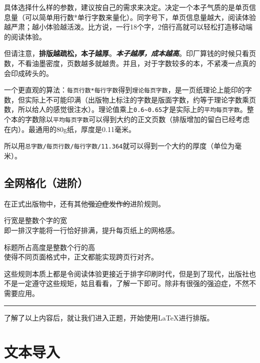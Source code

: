 \documentclass[10pt,openany]{book}
\begin{document}
\begin{sloppypar}
    \blankpar

    具体选择什么样的参数，建议按自己的需求来决定。决定一个本子气质的是单页信息量（可以简单用行数*单行字数来量化）。同字号下，单页信息量越大，阅读体验越严肃；越小体验越活泼。比方说，一行18个字，2倍行高就可以轻松打造移动端的阅读体验。

    但请注意，\textbf{排版越疏松，本子越厚}。\textbf{\textit{本子越厚，成本越高}}。印厂算钱的时候只看页数，不看油墨密度，页数越多就越贵。并且，对于字数较多的本，不紧凑一点真的会印成砖头的。

    一个更直观的算法：\texttt{每页行数*每行字数}得到\texttt{理论每页字数}，是一页纸理论上能印的字数，但实际上不可能印满（出版物上标注的字数是版面字数，约等于理论字数乘页数，所以给人的感觉很注水）。理论值乘上\texttt{0.6\textasciitilde{}0.65}才是实际上的\texttt{平均每页字数}。整个本的字数除以\texttt{平均每页字数}可以得到大约的正文页数（排版增加的留白已经考虑在内）。最通用的80g纸，厚度是0.11毫米。

    所以用\texttt{总字数/每页行数/每行字数/11.364}就可以得到一个大约的厚度（单位为毫米）。

    \section{全网格化（进阶）}

    在正式出版物中，还有其他\sout{强迫症发作的}进阶规则。

    \begin{tightenum}
        \item   行宽是整数个字的宽\\即一排汉字能将一行恰好排满，提升每页纸上的网格感。
        \item   标题所占高度是整数个行的高\\使得不同页面格式中，正文都能实现跨页行对齐。
    \end{tightenum}

    这些规则本质上都是令阅读体验更接近于排字印刷时代，但是到了现代，出版社也不是一定遵守这些规矩，姑且看看，了解一下即可。除非有很强的强迫症，不然不需要应用。

    \begin{center}\rule{0.5\linewidth}{0.5pt}\end{center}

    了解了以上内容后，就让我们进入正题，开始使用{\LaTeX}进行排版。

    \chapter{文本导入}


\end{sloppypar}
\end{document}
